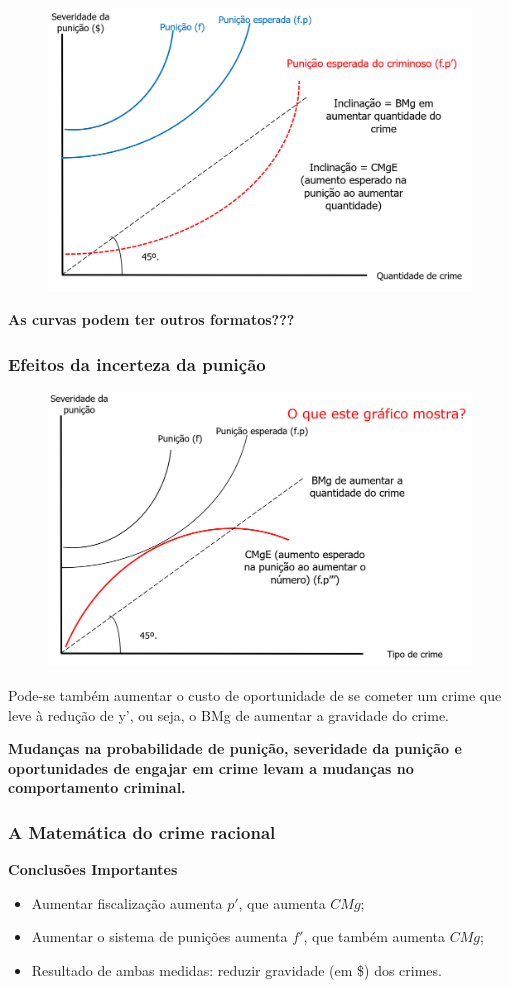 \documentclass[a4paper,12pt]{article}[abntex2]
\begin{document}
\begin{figure}[H]
    \centering
    \includegraphics[width=0.7\linewidth]{Imagens/a19i7.png}
\end{figure}

\textbf{As curvas podem ter outros formatos???}

\subsubsection{\textbf{Efeitos da incerteza da punição}}

\begin{figure}[H]
    \centering
    \includegraphics[width=0.75\linewidth]{Imagens/a19i8.png}
\end{figure}

Pode-se também aumentar o custo de oportunidade de se cometer um crime que leve à redução de y’, ou seja, o BMg de aumentar a gravidade do crime. 

\textbf{Mudanças na probabilidade de punição, severidade da punição e oportunidades de engajar em crime levam a mudanças no comportamento criminal.}

\subsubsection{\textbf{A Matemática do crime racional}}
\textbf{Conclusões Importantes}
\begin{itemize}
    \item Aumentar fiscalização aumenta $p'$, que aumenta $CMg$;
    \item Aumentar o sistema de punições aumenta $f'$, que também aumenta $CMg$;
    \item Resultado de ambas medidas: reduzir gravidade (em \$) dos crimes.
\end{itemize}
\end{document}
